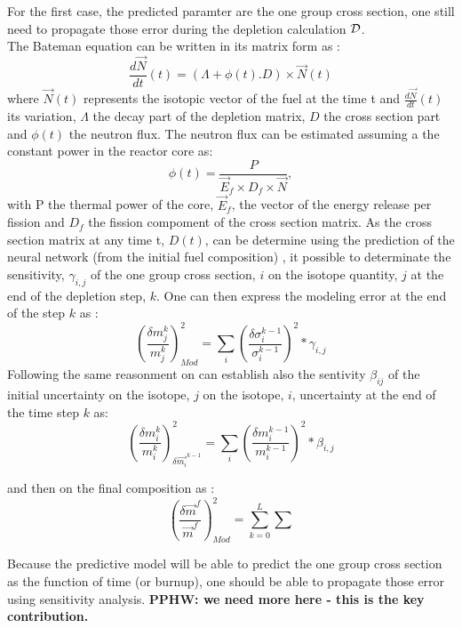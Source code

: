 \documentclass[dvips,12pt]{article}
\newcommand{\comment}[1]
{{\bfseries \color{red} #1}}
\begin{document}
For the first case, the predicted paramter are the
one group cross section, one still need to
propagate those error during the depletion
calculation ${\cal D}$.\\
The Bateman equation can be written in its matrix
form as :
\begin{equation}
  \frac{d\vec{N}}{dt}(t) = (\Lambda + \phi(t) . D) \times \vec{N}(t)
\end{equation}
where $\vec{N}(t)$ represents the isotopic vector
of the fuel at the time t and
$\frac{d\vec{N}}{dt}(t)$ its variation, $\Lambda$
the decay part of the depletion matrix, $D$ the
cross section part and $\phi(t)$ the neutron flux.
The neutron flux can be estimated assuming a the
constant power in the reactor core as:
\begin{equation}
  \phi(t) = \frac{P}{ \vec{E}_f \times D_f \times \vec{N}},
\end{equation}
with P the thermal power of the core, $\vec{E}_f$,
the vector of the energy release per fission and
$D_f$ the fission compoment of the cross section
matrix.
As the cross section matrix at any time t, $D(t)$,
can be determine using the prediction of the
neural network (from the initial fuel composition)
, it possible to determinate the sensitivity, $\gamma_{i,j}$  of
the one group cross section, $i$ on the isotope quantity, $j$ at
the end of the depletion step, $k$. One can then
express the modeling error at the end of the step $k$ as :
\begin{equation}
  \left( \frac{\delta m_j^{k}}{m_j^{k}} \right)^{2} _{Mod} = \sum_{i}\left( \frac{\delta \sigma_i^{k-1}}{\sigma_i^{k-1}} \right)^{2} *\gamma_{i,j}
\end{equation}
Following the same reasonment on can establish also the sentivity $\beta_{ij}$ of the initial uncertainty on the isotope, $j$ on the isotope, $i$, uncertainty at the end of the time step $k$ as:
\begin{equation}
  \left( \frac{\delta m_i^{k}}{m_i^{k}} \right)^{2} _{\delta \vec{m_i}^{k-1} } = \sum_{i}\left( \frac{\delta m_i^{k-1}}{m_i^{k-1}} \right)^{2} *\beta_{i,j}
\end{equation}


and then on the final composition as :
\begin{equation}
  \left( \frac{\delta \vec{m}^{f}}{\vec{m}^{f}} \right)^{2} _{Mod} = \sum_{k=0}^{L}\sum_{}
\end{equation}



Because the predictive model will be able to
predict the one group cross section as the
function of time (or burnup), one should be able
to propagate those error using sensitivity
analysis.  \comment{PPHW: we need more here - this
  is the key contribution.}
\end{document}
